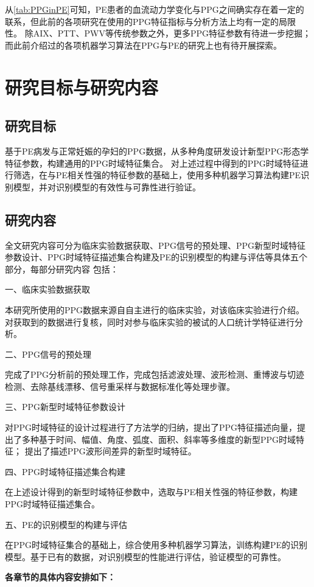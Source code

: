 从\autoref{tab:PPGinPE}可知，PE患者的血流动力学变化与PPG之间确实存在着一定的联系，但此前的各项研究在使用的PPG特征指标与分析方法上均有一定的局限性。
除AIX、PTT、PWV等传统参数之外，更多PPG特征参数有待进一步挖掘；而此前介绍过的各项机器学习算法在PPG与PE的研究上也有待开展探索。

\section{研究目标与研究内容}

\subsection{研究目标}
基于PE病发与正常妊娠的孕妇的PPG数据，从多种角度研发设计新型PPG形态学特征参数，构建通用的PPG时域特征集合。
对上述过程中得到的PPG时域特征进行筛选，在与PE相关性强的特征参数的基础上，使用多种机器学习算法构建PE识别模型，并对识别模型的有效性与可靠性进行验证。
\subsection{研究内容}
全文研究内容可分为临床实验数据获取、PPG信号的预处理、PPG新型时域特征参数设计、PPG时域特征描述集合构建及PE的识别模型的构建与评估等具体五个部分，每部分研究内容
包括：

一、临床实验数据获取

本研究所使用的PPG数据来源自自主进行的临床实验，对该临床实验进行介绍。对获取到的数据进行复核，同时对参与临床实验的被试的人口统计学特征进行分析。

二、PPG信号的预处理

完成了PPG分析前的预处理工作，完成包括滤波处理、波形检测、重博波与切迹检测、去除基线漂移、信号重采样与数据标准化等处理步骤。

三、PPG新型时域特征参数设计

对PPG时域特征的设计过程进行了方法学的归纳，提出了PPG特征描述向量，提出了多种基于时间、幅值、角度、弧度、面积、斜率等多维度的新型PPG时域特征；
提出了描述PPG波形间差异的新型时域特征。

四、PPG时域特征描述集合构建

在上述设计得到的新型时域特征参数中，选取与PE相关性强的特征参数，构建PPG时域特征描述集合。

五、PE的识别模型的构建与评估

在PPG时域特征集合的基础上，综合使用多种机器学习算法，训练构建PE的识别模型。基于已有的数据，对识别模型的性能进行评估，验证模型的可靠性。

\textbf{各章节的具体内容安排如下：}

